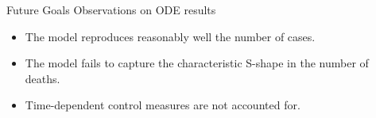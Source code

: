 \begin{slide}{Future Goals}
	{\large Observations on ODE results}
	
	\vspace{.5cm}
	
	\begin{itemize}
		\item The model reproduces reasonably well the number of cases.
		\item The model fails to capture the characteristic S-shape in the number of deaths.
		\item Time-dependent control measures are not accounted for.
	\end{itemize}
\end{slide}